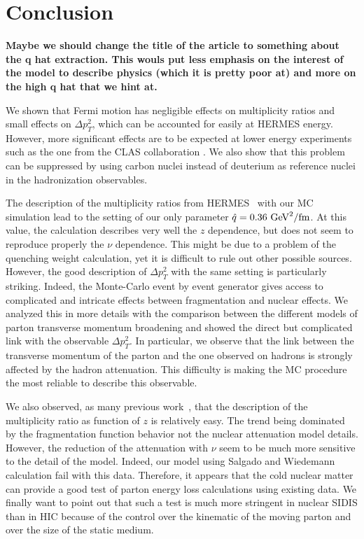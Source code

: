 \section{Conclusion}
{\bf Maybe we should change the title of the article to something about the q hat extraction. This wouls put less emphasis on the interest of the model to describe physics (which it is pretty poor at) and more on the high q hat that we hint at.} 

We shown that Fermi motion has negligible effects on multiplicity ratios and small effects on $\Delta p_T^2$, which can be accounted for easily at HERMES energy. However, more significant effects are to be expected at lower energy experiments such as the one from the CLAS collaboration \cite{Brooks:2009xg}. We also show that this problem can be suppressed by using carbon nuclei instead of deuterium as reference nuclei in the hadronization observables. 

The description of the multiplicity ratios from HERMES~\cite{Airapetian:2007vu} with our MC simulation lead to the setting of our only parameter ${\hat q} = 0.36\ \text{GeV}^2/\text{fm}$. At this value, the calculation describes very well the $z$ dependence, but does not seem to reproduce properly the $\nu$ dependence.  This might be due to a problem of the quenching weight calculation, yet it is difficult to rule out other possible sources. However, the good description of $\Delta p_T^2$ with the same setting is particularly striking. Indeed, the Monte-Carlo event by event generator gives access to complicated and intricate effects between fragmentation and nuclear effects. We analyzed this in more details with the comparison between the different models of parton transverse momentum broadening and showed the direct but complicated link with the observable $\Delta p_T^2$. In particular, we observe that the link between the transverse momentum of the parton and the one observed on hadrons is strongly affected by the hadron attenuation. This difficulty is making the MC procedure the most reliable to describe this observable. 

We also observed, as many previous work~\cite{Accardi:2009qv}, that the description of the multiplicity ratio as function of $z$ is relatively easy.  The trend being dominated by the fragmentation function behavior not the nuclear attenuation model details. However, the reduction of the attenuation with $\nu$ seem to be much more sensitive to the detail of the model. Indeed, our model using Salgado and Wiedemann calculation fail with this data.  Therefore, it appears that the cold nuclear matter can provide a good test of parton energy loss calculations using existing data. We finally want to point out that such a test is much more stringent in nuclear SIDIS than in HIC because of the control over the kinematic of the moving parton and over the size of the static medium.

